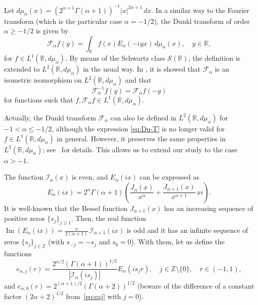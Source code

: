 \documentclass[11pt]{amsart}
\theoremstyle{plain}
\renewcommand{\Im}{\operatorname{Im}}
\begin{document}
Let $d\mu_{\alpha}(x) = (2^{\alpha+1}\Gamma(\alpha+1))^{-1}|x|^{2\alpha+1}\, dx$.
In a similar way to the Fourier transform (which is the particular case $\alpha = -1/2$),
the Dunkl transform of order $\alpha \ge -1/2$ is given by
\begin{equation}
\label{eq:Du-T}
  \mathcal{F}_\alpha f(y) = \int_{\mathbb{R}}f(x)E_{\alpha}(-iyx)\,d\mu_{\alpha}(x),
  \quad y\in \mathbb{R},
\end{equation}
for $f\in L^1(\mathbb{R},d\mu_{\alpha})$. By means of the Schwartz class $\mathcal{S}(\mathbb{R})$, the definition is extended to $L^2(\mathbb{R},d\mu_{\alpha})$ in the usual way. 
In \cite{Jeu}, it is showed that $\mathcal{F}_{\alpha}$ is an isometric isomorphism on $L^2(\mathbb{R},d\mu_{\alpha})$ and that 
\[
  \mathcal{F}_{\alpha}^{-1}f(y) = \mathcal{F}_{\alpha}f(-y)
\]
for functions such that $f, \mathcal{F}_{\alpha}f \in L^1(\mathbb{R}, d\mu_{\alpha})$.

Actually, the Dunkl transform $\mathcal{F}_{\alpha}$ can also be defined in $L^2(\mathbb{R},d\mu_{\alpha})$ for $-1 < \alpha \le -1/2$, although the expression \eqref{eq:Du-T} is no longer valid for $f\in L^1(\mathbb{R},d\mu_{\alpha})$ in general. However, it preserves the same properties in $L^2(\mathbb{R},d\mu_{\alpha})$; see~\cite{Rosenblum} for details.
This allows us to extend our study to the case $\alpha > -1$.

The function $\mathcal{I}_{\alpha}(x)$ is even, and $E_\alpha(ix)$ can be expressed as
\begin{equation*}
  E_\alpha(ix) = 2^\alpha \Gamma(\alpha+1) \left( \frac{J_\alpha(x)}{x^\alpha}
  + \frac{J_{\alpha+1}(x)}{x^{\alpha+1}}\,xi \right).
\end{equation*}
It is well-known that the Bessel function $J_{\alpha+1}(x)$ has an 
increasing sequence of positive zeros $\{s_j\}_{j\ge1}$.
Then, the real function
$\Im(E_{\alpha}(ix)) = \frac{x}{2(\alpha+1)}\,\mathcal{I}_{\alpha+1}(ix)$
is odd and it has an infinite sequence of zeros $\{s_j\}_{j\in \mathbb{Z}}$
(with $s_{-j} = -s_j$ and $s_0 = 0$). With them, let us define the functions
\begin{equation}
\label{eq:eaj}
  e_{\alpha,j}(r) = \frac{2^{\alpha/2}(\Gamma(\alpha+1))^{1/2}}
    {|\mathcal{I}_{\alpha}(is_j)|} E_{\alpha}(is_j r),
  \quad j\in \mathbb{Z} \setminus\{0\}, \quad r \in (-1,1),
\end{equation}
and $e_{\alpha,0}(r) = 2^{(\alpha+1)/2}(\Gamma(\alpha+2))^{1/2}$ (beware of the difference of a constant factor $(2\alpha+2)^{1/2}$ from~\eqref{eq:eaj} with $j=0$).
\end{document}
